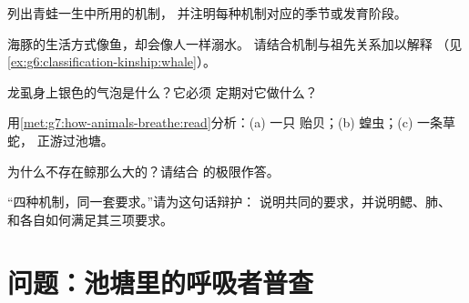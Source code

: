 \begin{exercise}[$\star\star$]\label{exo:g7:how-animals-breathe:7}
列出青蛙一生中所用的机制，
并注明每种机制对应的季节或发育阶段。
\end{exercise}

\begin{exercise}[$\star\star$]\label{exo:g7:how-animals-breathe:8}
海豚的生活方式像鱼，却会像人一样溺水。
请结合机制与祖先关系加以解释
（见\cref{ex:g6:classification-kinship:whale}）。
\end{exercise}

\begin{exercise}[$\star\star$]\label{exo:g7:how-animals-breathe:9}
龙虱身上银色的气泡是什么？它必须
定期对它做什么？
\end{exercise}

\begin{exercise}[$\star\star$]\label{exo:g7:how-animals-breathe:10}
用\cref{met:g7:how-animals-breathe:read}分析：(a) 一只
贻贝；(b) 蝗虫；(c) 一条草蛇，
正游过池塘。
\end{exercise}

\begin{exercise}[$\star\star$]\label{exo:g7:how-animals-breathe:11}
为什么不存在鲸那么大的？请结合
的极限作答。
\end{exercise}

\begin{exercise}[$\star\star\star$]\label{exo:g7:how-animals-breathe:12}
“四种机制，同一套要求。”请为这句话辩护：
说明共同的要求，并说明鳃、肺、
和各自如何满足其三项要求。
\end{exercise}

\section{问题：池塘里的呼吸者普查}

